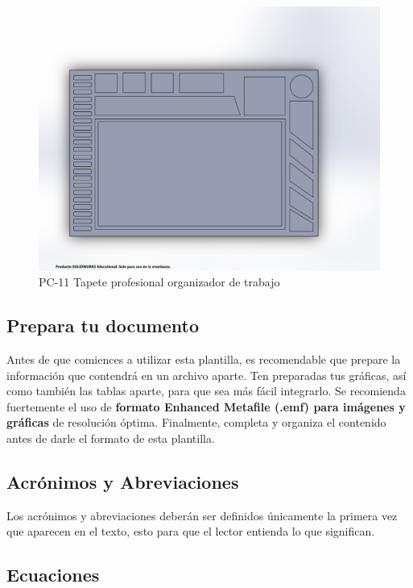     \begin{figure}[H]
        \centering
        \includegraphics[trim = {1mm 10mm 30mm 30mm},clip,scale=0.2]{3/Img/tapeteProfesionalOrganizadorDeTrabajoFigura.pdf}
        \caption{PC-11 Tapete profesional organizador de trabajo}
        \label{fig:tapeteProfesionalOrganizadorDeTrabajoFigura}
    \end{figure}
    \subsection{Prepara tu documento}
    
    Antes de que comiences a utilizar esta plantilla, es recomendable que prepare la información que contendrá en un archivo aparte. 
    Ten preparadas tus gráficas, así como también las tablas aparte, para que sea más fácil integrarlo. 
    Se recomienda fuertemente el uso de \textbf{formato Enhanced Metafile (.emf) para imágenes y gráficas} de resolución óptima. 
    Finalmente, completa y organiza el contenido antes de darle el formato de esta plantilla. 
    
    \subsection{Acrónimos y Abreviaciones}
    
    Los acrónimos y abreviaciones deberán ser definidos únicamente la primera vez que aparecen en el texto, esto para que el lector entienda lo que significan.
    
    \subsection{Ecuaciones}
    
